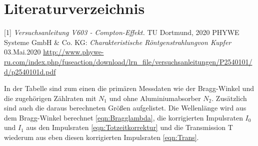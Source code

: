 \documentclass[titlepage = firstcover]{scrartcl}
\begin{document}
    \newpage
    \section{Literaturverzeichnis}
            [1] \textit{Versuchsanleitung V603 - Compton-Effekt.} TU Dortmund, 2020 \newline
            [2] PHYWE Systeme GmbH \& Co. KG: \textit{Charakteristische Röntgenstrahlungvon Kupfer} 03.Mai.2020
                \url{http://www.phywe-ru.com/index.php/fuseaction/download/lrn_file/versuchsanleitungen/P2540101/d/p2540101d.pdf}

    \newpage
    

    \begin{table}[h]
        \centering
        \caption{In der Tabelle sind zum einen die primären Messdaten wie der Bragg-Winkel und die zugehörigen Zählraten mit $N_1$ und ohne Aluminiumabsorber $N_2$. Zusätzlich sind auch die daraus berechneten Größen aufgelistet. Die Wellenlänge wird aus dem Bragg-Winkel berechnet \ref{eqn:Bragglambda}, die korrigierten Impulsraten $I_0$ und $I_1$ aus den Impulsraten \ref{eqn:Totzeitkorrektur} und die Transmission T wiederum aus eben diesen korrigierten Impulsraten \ref{eqn:Trans}.}
        \label{tab:Transmission}


\end{table}
\end{document}
